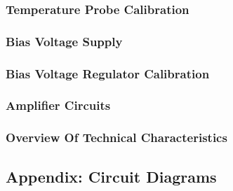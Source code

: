 \subsubsection{Temperature Probe Calibration}
\subsubsection{Bias Voltage Supply}
\subsubsection{Bias Voltage Regulator Calibration}
\subsubsection{Amplifier Circuits}
\subsubsection{Overview Of Technical Characteristics}

\subsection{Appendix: Circuit Diagrams}
